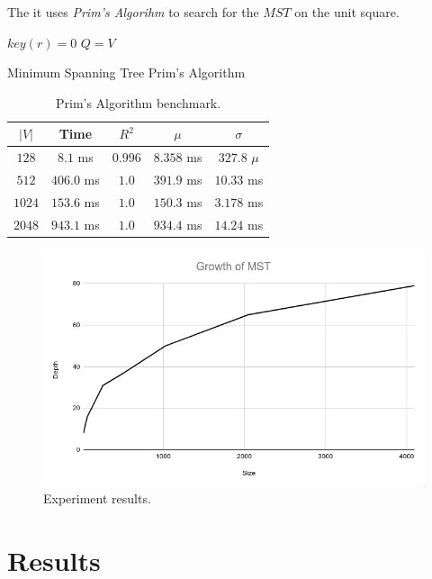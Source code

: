 \documentclass[12pt, a4paper]{article}
\begin{document}


The it uses \textit{Prim's Algorihm} to search for the $MST$ on the unit square.

\begin{algorithm}[H]
  \SetAlgoLined
  \DontPrintSemicolon
  $key(r) = 0$ 
  $Q = V$\;
  \caption{Minimum Spanning Tree Prim's Algorithm}
\end{algorithm}

\begin{table}[H]
  \center
  \begin{tabular}{ccccc}
    $|V|$  & Time       & $R^2$   & $\mu$      & $\sigma$    \\ \hline
    $128$  & $8.1$   ms & $0.996$ & $8.358$ ms & $327.8$ $\mu$ \\
    $512 $ & $406.0$ ms & $1.0  $ & $391.9$ ms & $10.33$ ms    \\
    $1024$ & $153.6$ ms & $1.0  $ & $150.3$ ms & $3.178$ ms    \\
    $2048$ & $943.1$ ms & $1.0  $ & $934.4$ ms & $14.24$ ms
  \end{tabular}
\caption{Prim's Algorithm benchmark.}
\label{table:1}
\end{table}

\begin{figure}[H]
  \center
  \includegraphics[scale=0.5]{plot}
  \caption{Experiment results.}
  \label{fig:1}
\end{figure}

\section{Results}\label{sec:3}




\end{document}
